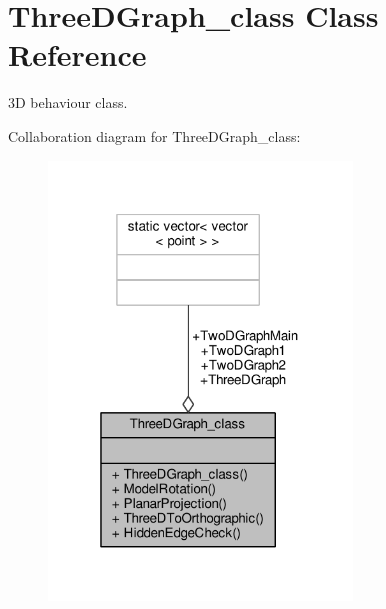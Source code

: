 \hypertarget{classThreeDGraph__class}{}\section{Three\+D\+Graph\+\_\+class Class Reference}
\label{classThreeDGraph__class}


3D behaviour class.  




Collaboration diagram for Three\+D\+Graph\+\_\+class\+:\nopagebreak
\begin{figure}[H]
\begin{center}
\leavevmode
\includegraphics[width=229pt]{classThreeDGraph__class__coll__graph}
\end{center}
\end{figure}
